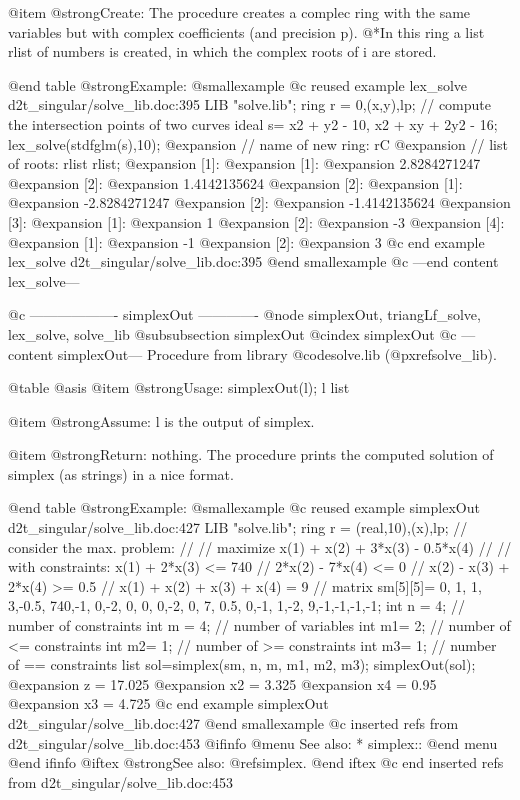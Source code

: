 @item @strong{Create:}
The procedure creates a complec ring with the same variables but
with complex coefficients (and precision p).
@*In this ring a list rlist of numbers is created, in which the complex
roots of i are stored.

@end table
@strong{Example:}
@smallexample
@c reused example lex_solve d2t_singular/solve_lib.doc:395 
LIB "solve.lib";
ring r = 0,(x,y),lp;
// compute the intersection points of two curves
ideal s=  x2 + y2 - 10, x2 + xy + 2y2 - 16;
lex_solve(stdfglm(s),10);
@expansion{} // name of new ring: rC
@expansion{} // list of roots: rlist
rlist;
@expansion{} [1]:
@expansion{}    [1]:
@expansion{}       2.8284271247
@expansion{}    [2]:
@expansion{}       1.4142135624
@expansion{} [2]:
@expansion{}    [1]:
@expansion{}       -2.8284271247
@expansion{}    [2]:
@expansion{}       -1.4142135624
@expansion{} [3]:
@expansion{}    [1]:
@expansion{}       1
@expansion{}    [2]:
@expansion{}       -3
@expansion{} [4]:
@expansion{}    [1]:
@expansion{}       -1
@expansion{}    [2]:
@expansion{}       3
@c end example lex_solve d2t_singular/solve_lib.doc:395
@end smallexample
@c ---end content lex_solve---

@c ------------------- simplexOut -------------
@node simplexOut, triangLf_solve, lex_solve, solve_lib
@subsubsection simplexOut
@cindex simplexOut
@c ---content simplexOut---
Procedure from library @code{solve.lib} (@pxref{solve_lib}).

@table @asis
@item @strong{Usage:}
simplexOut(l); l list

@item @strong{Assume:}
l is the output of simplex.

@item @strong{Return:}
nothing. The procedure prints the computed solution of simplex
(as strings) in a nice format.

@end table
@strong{Example:}
@smallexample
@c reused example simplexOut d2t_singular/solve_lib.doc:427 
LIB "solve.lib";
ring r = (real,10),(x),lp;
// consider the max. problem:
//
//    maximize  x(1) + x(2) + 3*x(3) - 0.5*x(4)
//
//  with constraints:   x(1) +          2*x(3)          <= 740
//                             2*x(2)          - 7*x(4) <=   0
//                               x(2) -   x(3) + 2*x(4) >=   0.5
//                      x(1) +   x(2) +   x(3) +   x(4)  =   9
//
matrix sm[5][5]=   0, 1, 1, 3,-0.5,
740,-1, 0,-2, 0,
0, 0,-2, 0, 7,
0.5, 0,-1, 1,-2,
9,-1,-1,-1,-1;
int n = 4;  // number of constraints
int m = 4;  // number of variables
int m1= 2;  // number of <= constraints
int m2= 1;  // number of >= constraints
int m3= 1;  // number of == constraints
list sol=simplex(sm, n, m, m1, m2, m3);
simplexOut(sol);
@expansion{} z = 17.025
@expansion{} x2 = 3.325
@expansion{} x4 = 0.95
@expansion{} x3 = 4.725
@c end example simplexOut d2t_singular/solve_lib.doc:427
@end smallexample
@c inserted refs from d2t_singular/solve_lib.doc:453
@ifinfo
@menu
See also:
* simplex::
@end menu
@end ifinfo
@iftex
@strong{See also:}
@ref{simplex}.
@end iftex
@c end inserted refs from d2t_singular/solve_lib.doc:453

